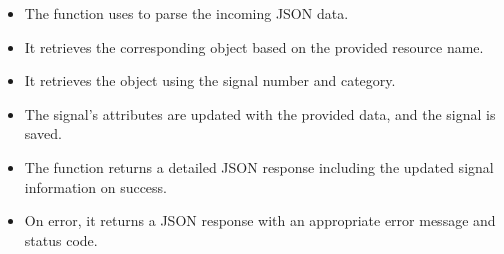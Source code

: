 \documentclass[letterpaper,10pt,english]{sphinxmanual}
\begin{document}
\begin{fulllineitems}
\begin{description}
\begin{sphinxVerbatim}[commandchars=\\\{\}]
\end{sphinxVerbatim}

\begin{itemize}
\item {} 
\sphinxAtStartPar
The function uses  to parse the incoming JSON data.

\item {} 
\sphinxAtStartPar
It retrieves the corresponding  object based on the provided resource name.

\item {} 
\sphinxAtStartPar
It retrieves the  object using the signal number and category.

\item {} 
\sphinxAtStartPar
The signal’s attributes are updated with the provided data, and the signal is saved.

\item {} 
\sphinxAtStartPar
The function returns a detailed JSON response including the updated signal information on success.

\item {} 
\sphinxAtStartPar
On error, it returns a JSON response with an appropriate error message and status code.

\end{itemize}

\end{description}

\end{fulllineitems}
\end{document}
